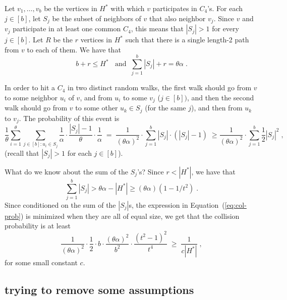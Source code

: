 \documentclass{article}
\begin{document}
Let $v_1,\dots,v_b$ be the vertices in $H^*$ with which $v$ participates in $C_4$'s. For each $j\in [b]$, let $S_j$ be the subset of neighbors of $v$ that also neighbor $v_j$. Since $v$ and $v_j$ participate in at least one common $C_4$, this means that $|S_j| > 1$ for every $j \in [b]$. Let $R$ be the $r$ vertices in $H^*$ such that there is a single length-2 path from $v$ to each of them.
We have that
\begin{equation}\label{eq:b-r-Sj}
b+r \leq  H^* \;\;\mbox{ and}\;\; \sum_{j=1}^b |S_j| + r = \theta \alpha\;.
\end{equation}


In order to hit a $C_4$ in two distinct random walks, the first walk should go from $v$ to some neighbor $u_i$ of $v$, and from $u_i$ to some $v_j$ ($j \in [b])$, and then the second walk should go from $v$ to some other $u_k \in S_j$ (for the same $j$), and then from $u_k$ to $v_j$. The probability of this event is
\begin{equation}
\frac{1}{\theta}\sum_{i=1}^{\theta} \sum_{j\in [b]: u_i \in S_j} \frac{1}{\alpha} \cdot \frac{|S_j|-1}{\theta}\cdot \frac{1}{\alpha} \;=\; \frac{1}{(\theta\alpha)^2} \cdot \sum_{j=1}^b |S_j|\cdot (|S_j|-1)
\; \geq \frac{1}{(\theta\alpha)^2} \cdot \sum_{j=1}^b \frac{1}{2}|S_j|^2\;,
\label{eq:col-prob}
\end{equation}
(recall that $|S_j|>1$ for each $j \in [b]$).

What do we know about the sum of the $S_j$'s? Since $r < |H^*|$, we have that
\begin{equation}\label{eq:sym-of-Sj}
\sum_{j=1}^b |S_j| > \theta \alpha - |H^*| \geq (\theta\alpha)(1-1/t^2)\;.
\end{equation}
Since conditioned on the sum of the $|S_j|$s, the expression in Equation~(\ref{eq:col-prob}) is minimized when they are all of equal size, we get that the collision probability is at least
\begin{equation}
\frac{1}{(\theta\alpha)^2} \cdot \frac{1}{2}\cdot b\cdot \frac{(\theta\alpha)^2}{b^2}\cdot \frac{(t^2-1)^2}{t^4}
\;\geq\; \frac{1}{c|H^*|}\;,
\label{eq:col-prob2}
\end{equation}
for some small constant $c$.

\subsection*{trying to remove some assumptions}
\end{document}
